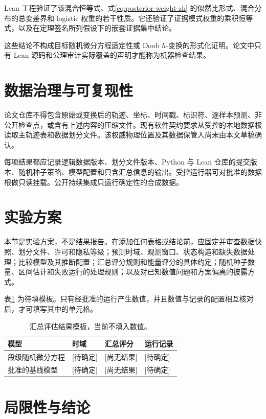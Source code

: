 \documentclass[UTF8,11pt]{ctexart}
\begin{document}
Lean 工程验证了该混合恒等式、式\eqref{eq:posterior-weight-zh} 的似然比形式、混合分布的总变差界和 logistic 权重的若干性质。它还验证了证据模式权重的乘积恒等式，以及在定理签名所列假设下的嵌套证据集中结论。

这些结论不构成目标随机微分方程适定性或 Doob \(h\)-变换的形式化证明。论文中只有 Lean 源码和公理审计实际覆盖的声明才能称为机器检查结果。

\section{数据治理与可复现性}

论文仓库不得包含原始或变换后的轨迹、坐标、时间戳、标识符、逐样本预测、非公开检查点，或含有上述内容的压缩文件。现有软件契约要求从受控的本地数据根读取主轨迹表和数据划分文件。该权威物理位置及其数据保管人尚未由本文草稿确认。

每项结果都应记录逻辑数据版本、划分文件版本、Python 与 Lean 仓库的提交版本、随机种子策略、模型配置和只含汇总信息的输出。受控运行器可对批准的数据根做只读挂载。公开持续集成只运行确定性的合成数据。

\section{实验方案}

本节是实验方案，不是结果报告。在添加任何表格或结论前，应固定并审查数据快照、划分文件、许可和隐私等级；预测时域、观测窗口、状态构造和缺失数据处理；比较模型及其推断配置；汇总评分规则和能量评分的具体约定；随机种子数量、区间估计和失败运行的处理规则；以及对已知数值问题和方案偏离的披露方式。

表\ref{tab:results-template-zh} 为待填模板。只有经批准的运行产生数值，并且数值与记录的配置相互核对后，才可填写其中的单元格。

\begin{table}[ht]
\centering
\caption{汇总评估结果模板，当前不填入数值。}
\label{tab:results-template-zh}
\begin{tabular}{llll}
\toprule
模型 & 时域 & 汇总评分 & 运行记录 \\
\midrule
段级随机微分方程 & [待确定] & [尚无结果] & [待确定] \\
批准的基线模型 & [待确定] & [尚无结果] & [待确定] \\
\bottomrule
\end{tabular}
\end{table}

\section{局限性与结论}
\end{document}
